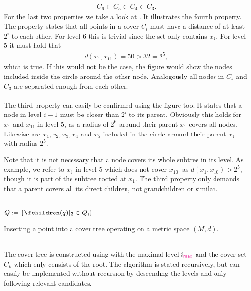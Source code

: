 	\begin{align*}
		C_6 \subset C_5 \subset C_4 \subset C_3.
	\end{align*}
	For the last two properties we take a look at . It illustrates the fourth property.
	The property states that all points in a cover $C_i$ must have a distance of at least $2^i$ to each other.
	For level $6$ this is trivial since the set only contains $x_1$. For level $5$ it must hold that
	\begin{align*}
		d(x_1, x_{11}) = 50 > 32 = 2^5,
	\end{align*}
	which is true. If this would not be the case, the figure would show the nodes included inside the circle
	around the other node. Analogously all nodes in $C_4$ and $C_3$ are separated enough from each other.\\\\
	The third property can easily be confirmed using the figure too. It states that a node in level $i - 1$ must
	be closer than $2^i$ to its parent. Obviously this holds for $x_1$ and $x_{11}$ in level $5$, as a radius
	of $2^6$ around their parent $x_1$ covers all nodes. Likewise are $x_1, x_2, x_3, x_4$ and $x_5$ included
	in the circle around their parent $x_1$ with radius $2^5$.
	
	Note that it is not necessary that a node covers its whole subtree in its level. As example, we refer to $x_1$ in level $5$
	which does not cover $x_{10}$, as $d(x_1, x_{10}) > 2^5$, though it is part of the subtree rooted at $x_1$. The third property only demands
	that a parent covers all its direct children, not grandchildren or similar.\\\\
	\IncMargin{1em}
	\begin{algorithm}
		\BlankLine
		\BlankLine
		$Q := \{\fchildren(q) | q \in Q_i\}$\;
		\BlankLine
		\BlankLine
		\caption{Inserting a point into a cover tree operating on a metric space $(M, d)$.}\label{coverTreeInsert}
	\end{algorithm}\DecMargin{1em}\quad\\
	The cover tree is constructed using  with the maximal level $i_{\textcolor{magenta}{\textsf{max}}}$ and the cover
	set $C_k$ which only consists of the root. The algorithm is stated recursively, but can easily be implemented
	without recursion by descending the levels and only following relevant candidates.
	
